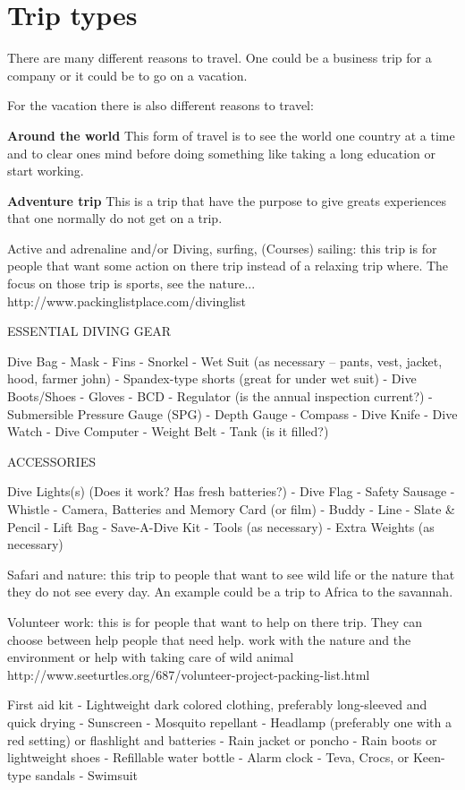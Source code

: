 \section{Trip types}
There are many different reasons to travel.
One could be a business trip for a company or it could be to go on a vacation.

For the vacation there is also different reasons to travel:

\textbf{Around the world}
This form of travel is to see the world one country at a time and to clear ones mind before doing something like taking a long education or start working.

\textbf{Adventure trip}
This is a trip that have the purpose to give greats experiences that one normally do not get on a trip.

Active and adrenaline and/or Diving, surfing, (Courses) sailing:
this trip is for people that want some action on there trip instead of a relaxing trip where. The focus on those trip is sports, see the nature...
http://www.packinglistplace.com/divinglist

ESSENTIAL DIVING GEAR

Dive Bag - Mask - Fins - Snorkel - Wet Suit (as necessary -- pants, vest, jacket, hood, farmer john) - Spandex-type shorts (great for under wet suit) - Dive Boots/Shoes - Gloves - BCD - Regulator (is the annual inspection current?) - Submersible Pressure Gauge (SPG) - Depth Gauge - Compass - Dive Knife - Dive Watch - Dive Computer - Weight Belt - Tank (is it filled?)

ACCESSORIES

Dive Lights(s) (Does it work? Has fresh batteries?) - Dive Flag - Safety Sausage - Whistle - Camera, Batteries and Memory Card (or film) - Buddy - Line - Slate & Pencil - Lift Bag - Save-A-Dive Kit - Tools (as necessary) - Extra Weights (as necessary)


Safari and nature:
this trip to people that want to see wild life or the nature that they do not see every day. An example could be a trip to Africa to the savannah.

Volunteer work:
this is for people that want to help on there trip. They can choose between help people that need help. work with the nature and the environment or help with taking care of wild animal
http://www.seeturtles.org/687/volunteer-project-packing-list.html

First aid kit - Lightweight dark colored clothing, preferably long-sleeved and quick drying - Sunscreen - Mosquito repellant - Headlamp (preferably one with a red setting) or flashlight and batteries - Rain jacket or poncho - Rain boots or lightweight shoes - Refillable water bottle - Alarm clock - Teva, Crocs, or Keen-type sandals - Swimsuit

